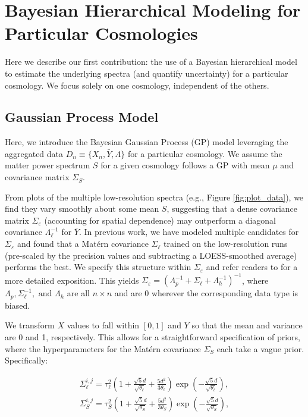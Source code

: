 \documentclass[11pt]{article}
\begin{document}
\section{Bayesian Hierarchical Modeling for Particular Cosmologies}
\label{sec:hm_fit}

Here we describe our first contribution: the use of a Bayesian hierarchical model to estimate the underlying spectra (and quantify uncertainty) for a particular cosmology.  We focus solely on one cosmology, independent of the others.

\subsection{Gaussian Process Model}

Here, we introduce the Bayesian Gaussian Process (GP) model leveraging the aggregated data $D_n \equiv \{X_n, \bar Y, \Lambda\}$ for a particular cosmology. We assume the matter power spectrum $S$ for a given cosmology follows a GP with mean $\mu$ and covariance matrix $\Sigma_S$.

From plots of the multiple low-resolution spectra (e.g., Figure \ref{fig:plot_data}), we find they vary smoothly about some mean $S$, suggesting that a dense covariance matrix $\Sigma_\varepsilon$ (accounting for spatial dependence) may outperform a diagonal covariance $\Lambda_\ell^{-1}$ for $\bar Y$. In previous work, we have modeled multiple candidates for $\Sigma_\varepsilon$ \citep{walsh2023bayesian} and found that a Mat\'ern covariance $\Sigma_\ell$ trained on the low-resolution runs (pre-scaled by the precision values and subtracting a LOESS-smoothed average) performs the best. We specify this structure within $\Sigma_\varepsilon$ and refer readers to \cite{walsh2023bayesian} for a more detailed exposition. This yields $\Sigma_\varepsilon=\left(\Lambda_p^{-1} + \Sigma_\ell + \Lambda_h^{-1}\right)^{-1}$, where $\Lambda_p, \Sigma_\ell^{-1}, \text{ and } \Lambda_h$ are all $n\times n$ and are 0 wherever the corresponding data type is biased.

We transform $X$ values to fall within $[0,1]$ and $Y$ so that the mean and variance are 0 and 1, respectively. This allows for a straightforward specification of priors, where the hyperparameters for the Mat\'ern covariance $\Sigma_S$ each take a vague prior. Specifically:

\begin{align}
\Sigma_\ell^{i,j} = \tau_\ell^2  \left( 1 + \frac{\sqrt{5}d}{\sqrt{\theta_\ell}} + \frac{5d^2}{3\theta_\ell}\right) \exp\left(-\frac{\sqrt{5}d}{\sqrt{\theta_\ell}}\right),\\
\Sigma_S^{i,j} = \tau_S^2  \left( 1 + \frac{\sqrt{5}d}{\sqrt{\theta_S}} + \frac{5d^2}{3\theta_S}\right) \exp\left(-\frac{\sqrt{5}d}{\sqrt{\theta_S}}\right),
\end{align}
\end{document}
